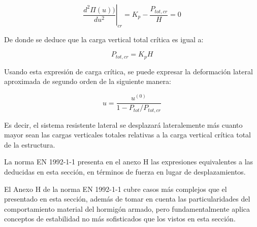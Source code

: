 $$\left.\frac{d^2 \Pi(u))}{d u^2}\right|_{cr} = K_p-\frac{P_{tot,cr}}{H}=0$$

De donde se deduce que la carga vertical total crítica es igual a:

$$P_{tot,cr} = K_p H$$

Usando esta expresión de carga crítica, se puede expresar la deformación lateral aproximada de segundo orden de la siguiente manera:

$$u=\frac{u^{(0)}}{1 - P_{tot}/P_{tot,cr}}$$

Es decir, el sistema resistente lateral se desplazará lateralemente más cuanto mayor sean las cargas verticales totales relativas a la carga vertical crítica total de la estructura.

La norma EN 1992-1-1 presenta en el anexo H las expresiones equivalentes a las deducidas en esta sección, en términos de fuerza en lugar de desplazamientos.

%
%
%
%
%

El Anexo H de la norma EN 1992-1-1 cubre casos más complejos que el presentado en esta sección, además de tomar en cuenta las particularidades del comportamiento material del hormigón armado, pero fundamentalmente aplica conceptos de estabilidad no más sofisticados que los vistos en esta sección.


